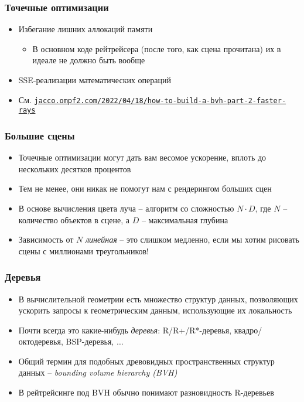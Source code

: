 \documentclass[handout,10pt]{beamer}
\begin{document}
\begin{frame}[fragile]
\frametitle{Точечные оптимизации}
\begin{itemize}
\item Избегание лишних аллокаций памяти
\pause
\begin{itemize}
\item В основном коде рейтрейсера (после того, как сцена прочитана) их в идеале не должно быть вообще
\end{itemize}
\pause
\item SSE-реализации математических операций
\pause
\item См. \href{https://jacco.ompf2.com/2022/04/18/how-to-build-a-bvh-part-2-faster-rays/}{\texttt{jacco.ompf2.com/2022/04/18/how-to-build-a-bvh-part-2-faster-rays}}
\end{itemize}
\end{frame}

\begin{frame}[fragile]
\frametitle{Большие сцены}
\begin{itemize}
\item Точечные оптимизации могут дать вам весомое ускорение, вплоть до нескольких десятков процентов
\pause
\item Тем не менее, они никак не помогут нам с рендерингом больших сцен
\pause
\item В основе вычисления цвета луча -- алгоритм со сложностью \begin{math}N \cdot D\end{math}, где \begin{math}N\end{math} -- количество объектов в сцене, а \begin{math}D\end{math} -- максимальная глубина
\pause
\item Зависимость от \begin{math}N\end{math} \textit{линейная} -- это слишком медленно, если мы хотим рисовать сцены с миллионами треугольников!
\end{itemize}
\end{frame}

\begin{frame}[fragile]
\frametitle{Деревья}
\begin{itemize}
\item В вычислительной геометрии есть множество структур данных, позволяющих ускорить запросы к геометрическим данным, использующие их локальность
\pause
\item Почти всегда это какие-нибудь \textit{деревья}: R/R+/R*-деревья, квадро/октодеревья, BSP-деревья, \begin{math}\dots\end{math}
\pause
\item Общий термин для подобных древовидных пространственных структур данных -- \textit{bounding volume hierarchy (BVH)}
\pause
\item В рейтрейсинге под BVH обычно понимают разновидность R-деревьев
\end{itemize}
\end{frame}
\end{document}
